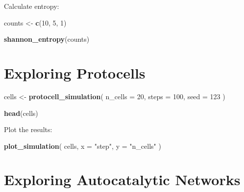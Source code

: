 \documentclass[
  oneside,
  openany]{book}
\newenvironment{Shaded}{\begin{snugshade}}{\end{snugshade}}
\newcommand{\AttributeTok}[1]{\textcolor[rgb]{0.13,0.29,0.53}{#1}}
\newcommand{\DecValTok}[1]{\textcolor[rgb]{0.00,0.00,0.81}{#1}}
\newcommand{\FloatTok}[1]{\textcolor[rgb]{0.00,0.00,0.81}{#1}}
\newcommand{\FunctionTok}[1]{\textcolor[rgb]{0.13,0.29,0.53}{\textbf{#1}}}
\newcommand{\NormalTok}[1]{#1}
\newcommand{\OtherTok}[1]{\textcolor[rgb]{0.56,0.35,0.01}{#1}}
\newcommand{\SpecialCharTok}[1]{\textcolor[rgb]{0.81,0.36,0.00}{\textbf{#1}}}
\newcommand{\StringTok}[1]{\textcolor[rgb]{0.31,0.60,0.02}{#1}}
\begin{document}
Calculate entropy:

\begin{Shaded}
\begin{Highlighting}[]
\NormalTok{counts }\OtherTok{\textless{}{-}} \FunctionTok{c}\NormalTok{(}\DecValTok{10}\NormalTok{, }\DecValTok{5}\NormalTok{, }\DecValTok{1}\NormalTok{)}

\FunctionTok{shannon\_entropy}\NormalTok{(counts)}
\end{Highlighting}
\end{Shaded}

\section{Exploring Protocells}\label{exploring-protocells}

\begin{Shaded}
\begin{Highlighting}[]
\NormalTok{cells }\OtherTok{\textless{}{-}} \FunctionTok{protocell\_simulation}\NormalTok{(}
  \AttributeTok{n\_cells =} \DecValTok{20}\NormalTok{,}
  \AttributeTok{steps =} \DecValTok{100}\NormalTok{,}
  \AttributeTok{seed =} \DecValTok{123}
\NormalTok{)}

\FunctionTok{head}\NormalTok{(cells)}
\end{Highlighting}
\end{Shaded}

Plot the results:

\begin{Shaded}
\begin{Highlighting}[]
\FunctionTok{plot\_simulation}\NormalTok{(}
\NormalTok{  cells,}
  \AttributeTok{x =} \StringTok{"step"}\NormalTok{,}
  \AttributeTok{y =} \StringTok{"n\_cells"}
\NormalTok{)}
\end{Highlighting}
\end{Shaded}

\section{Exploring Autocatalytic Networks}\label{exploring-autocatalytic-networks}

\begin{Shaded}
\end{Shaded}
\end{document}
